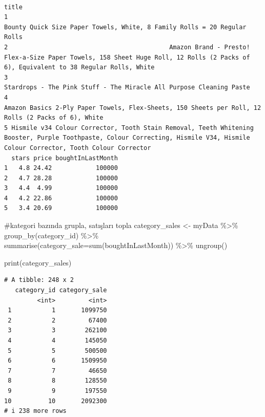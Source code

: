 \documentclass[
  letterpaper,
  DIV=11,
  numbers=noendperiod]{scrreprt}
\newenvironment{Shaded}{\begin{snugshade}}{\end{snugshade}}
\newcommand{\AttributeTok}[1]{\textcolor[rgb]{0.40,0.45,0.13}{#1}}
\newcommand{\CommentTok}[1]{\textcolor[rgb]{0.37,0.37,0.37}{#1}}
\newcommand{\FunctionTok}[1]{\textcolor[rgb]{0.28,0.35,0.67}{#1}}
\newcommand{\NormalTok}[1]{\textcolor[rgb]{0.00,0.23,0.31}{#1}}
\newcommand{\OtherTok}[1]{\textcolor[rgb]{0.00,0.23,0.31}{#1}}
\newcommand{\SpecialCharTok}[1]{\textcolor[rgb]{0.37,0.37,0.37}{#1}}
\begin{document}
\begin{verbatim}
                                                                                                                                                                            title
1                                                                                                        Bounty Quick Size Paper Towels, White, 8 Family Rolls = 20 Regular Rolls
2                                            Amazon Brand - Presto! Flex-a-Size Paper Towels, 158 Sheet Huge Roll, 12 Rolls (2 Packs of 6), Equivalent to 38 Regular Rolls, White
3                                                                                                             Stardrops - The Pink Stuff - The Miracle All Purpose Cleaning Paste
4                                                                              Amazon Basics 2-Ply Paper Towels, Flex-Sheets, 150 Sheets per Roll, 12 Rolls (2 Packs of 6), White
5 Hismile v34 Colour Corrector, Tooth Stain Removal, Teeth Whitening Booster, Purple Toothpaste, Colour Correcting, Hismile V34, Hismile Colour Corrector, Tooth Colour Corrector
  stars price boughtInLastMonth
1   4.8 24.42            100000
2   4.7 28.28            100000
3   4.4  4.99            100000
4   4.2 22.86            100000
5   3.4 20.69            100000
\end{verbatim}

\begin{Shaded}
\begin{Highlighting}[]
\CommentTok{\#kategori bazında grupla, satışları topla}
\NormalTok{category\_sales }\OtherTok{\textless{}{-}}\NormalTok{ myData }\SpecialCharTok{\%\textgreater{}\%} 
                  \FunctionTok{group\_by}\NormalTok{(category\_id) }\SpecialCharTok{\%\textgreater{}\%}
                  \FunctionTok{summarise}\NormalTok{(}\AttributeTok{category\_sale=}\FunctionTok{sum}\NormalTok{(boughtInLastMonth)) }\SpecialCharTok{\%\textgreater{}\%}
                  \FunctionTok{ungroup}\NormalTok{()}


\FunctionTok{print}\NormalTok{(category\_sales)}
\end{Highlighting}
\end{Shaded}

\begin{verbatim}
# A tibble: 248 x 2
   category_id category_sale
         <int>         <int>
 1           1       1099750
 2           2         67400
 3           3        262100
 4           4        145050
 5           5        500500
 6           6       1509950
 7           7         46650
 8           8        128550
 9           9        197550
10          10       2092300
# i 238 more rows
\end{verbatim}
\end{document}

